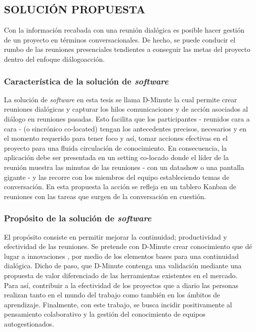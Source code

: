 \subsection{SOLUCIÓN PROPUESTA}

Con la información recabada con una reunión dialógica es posible hacer gestión de un proyecto en términos conversacionales. De hecho, se puede conducir el rumbo de las reuniones presenciales tendientes a conseguir las metas del proyecto dentro del enfoque diálogo\/acción.

\subsubsection{Característica de la solución de \textit{software}}

La solución de \textit{software} en esta tesis se llama D-Minute la cual permite crear reuniones dialógicas y capturar los hilos comunicaciones y de acción asociados al diálogo en reuniones pasadas. Esto facilita que los participantes - reunidos cara a cara - (o sincrónico co-located) tengan los antecedentes precisos, necesarios y en el momento requerido para tener foco y así, tomar acciones efectivas en el proyecto para una fluida circulación de conocimiento. En consecuencia, la aplicación debe ser presentada en un setting co-locado donde el líder de la reunión muestra las minutas de las reuniones - con un datashow o una pantalla gigante - y las recorre con los miembros del equipo estableciendo temas de conversación. En esta propuesta la acción se refleja en un tablero Kanban de reuniones con las tareas que surgen de la conversación en cuestión.

\subsubsection{Propósito de la solución de \textit{software}}

El propósito consiste en permitir mejorar la continuidad; productividad y efectividad de las reuniones. Se pretende con D-Minute crear conocimiento que dé lugar a innovaciones , por medio de los elementos bases para una continuidad dialógica. Dicho de paso, que D-Minute contenga una validación mediante una propuesta de valor diferenciado de las herramientas existentes en el mercado. Para así, contribuir a la efectividad de los proyectos que a diario las personas realizan tanto en el mundo del trabajo como también en los ámbitos de aprendizaje. Finalmente, con este trabajo, se busca incidir positivamente al pensamiento colaborativo y la gestión del conocimiento de equipos autogestionados.

